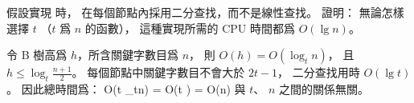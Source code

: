 \startEXERCISE
假設實現  時，
在每個節點內採用二分查找，而不是線性查找。
證明：
無論怎樣選擇 $t$ （$t$ 爲 $n$ 的函數），
這種實現所需的 CPU 時間都爲 $O(\lg n)$。
\stopEXERCISE

\startANSWER
令 B 樹高爲 $h$，所含關鍵字數目爲 $n$，
則 $O(h)=O(\log_{t}n)$，
且 $h\le \log_{t}\frac{n+1}{2}$。
每個節點中關鍵字數目不會大於 $2t-1$，
二分查找用時 $O(\lg t)$。
因此總時間爲：
\startformula
O(\lg t \times \log_{t}n) = O(\lg t \times {}) = O(\lg n)
\stopformula
與 $t$、 $n$ 之間的關係無關。
\stopANSWER